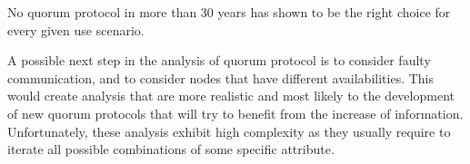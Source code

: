 \documentclass[conference]{IEEEtran}
\begin{document}
No quorum protocol in more than 30 years has shown to be the right choice
for every given use scenario.

A possible next step in the analysis of quorum protocol is to consider faulty
communication, and to consider nodes that have different availabilities.
This would create analysis that are more realistic and most likely to the
development of new quorum protocols that will try to benefit from the increase
of information.
Unfortunately, these analysis exhibit high complexity as they usually require
to iterate all possible combinations of some specific attribute.
\printbibliography
\end{document}
